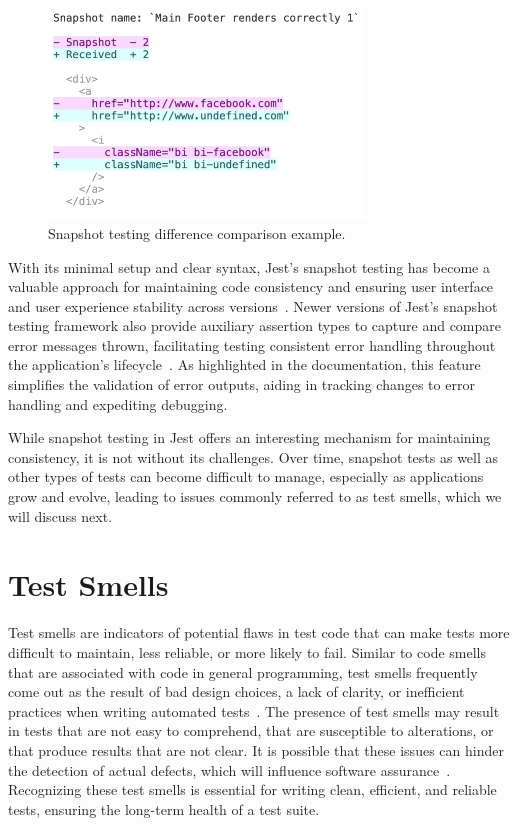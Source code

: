 \documentclass[
	msc, %
	english %
]{../ppgccufmg}
\begin{document}
    \begin{figure}[h]
        \centering
        \includegraphics[width=0.75\textwidth]{img/snapshot-diff.png}
        \caption{Snapshot testing difference comparison example.}
        \label{fig:snapshot-diff}
    \end{figure}


With its minimal setup and clear syntax, Jest’s snapshot testing has become a valuable approach for maintaining code consistency and ensuring user interface and user experience stability across versions~\cite{Fontana2015}. Newer versions of Jest's snapshot testing framework also provide auxiliary assertion types to capture and compare error messages thrown, facilitating testing consistent error handling throughout the application's lifecycle~\cite{bekkhus2017jest22}. As highlighted in the documentation, this feature simplifies the validation of error outputs, aiding in tracking changes to error handling and expediting debugging.
    
While snapshot testing in Jest offers an interesting mechanism for maintaining consistency, it is not without its challenges. Over time, snapshot tests as well as other types of tests can become difficult to manage, especially as applications grow and evolve, leading to issues commonly referred to as test smells, which we will discuss next.  

    \section{Test Smells}\label{sec:ch2-test-smells}

    Test smells are indicators of potential flaws in test code that can make tests more difficult to maintain, less reliable, or more likely to fail. Similar to code smells that are associated with code in general programming, test smells frequently come out as the result of bad design choices, a lack of clarity, or inefficient practices when writing automated tests~\cite{Fowler2018}. The presence of test smells may result in tests that are not easy to comprehend, that are susceptible to alterations, or that produce results that are not clear. It is possible that these issues can hinder the detection of actual defects, which will influence software assurance~\cite{beck2003}. Recognizing these test smells is essential for writing clean, efficient, and reliable tests, ensuring the long-term health of a test suite.
\end{document}
